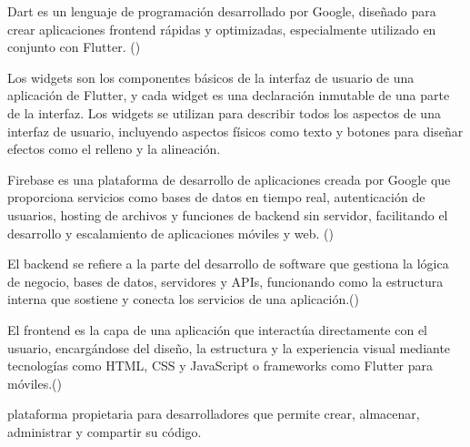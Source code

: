 \begin{definition}[Dart]

Dart es un lenguaje de programación desarrollado por Google, diseñado para crear aplicaciones frontend rápidas y optimizadas, especialmente utilizado en conjunto con Flutter. (\cite{dart})
\end{definition}

\begin{definition}[Widget]

Los widgets son los componentes básicos de la interfaz de usuario de una aplicación de Flutter, y cada widget es una declaración inmutable de una parte de la interfaz. Los widgets se utilizan para describir todos los aspectos de una interfaz de usuario, incluyendo aspectos físicos como texto y botones para diseñar efectos como el relleno y la alineación.
\end{definition}



\begin{definition}[Firebase]

Firebase es una plataforma de desarrollo de aplicaciones creada por Google que proporciona servicios como bases de datos en tiempo real, autenticación de usuarios, hosting de archivos y funciones de backend sin servidor, facilitando el desarrollo y escalamiento de aplicaciones móviles y web. (\cite{firebase})
\end{definition}


\begin{definition}[Backend]
El backend se refiere a la parte del desarrollo de software que gestiona la lógica de negocio, bases de datos, servidores y APIs, funcionando como la estructura interna que sostiene y conecta los servicios de una aplicación.(\cite{backend})
\end{definition}



\begin{definition}[Frontend]
  El frontend es la capa de una aplicación que interactúa directamente con el usuario, encargándose del diseño, la estructura y la experiencia visual mediante tecnologías como HTML, CSS y JavaScript o frameworks como Flutter para móviles.(\cite{frontend})
\end{definition}


\begin{definition}[GitHub]
  plataforma propietaria para desarrolladores que permite crear, almacenar, administrar y compartir su código.
\end{definition}

